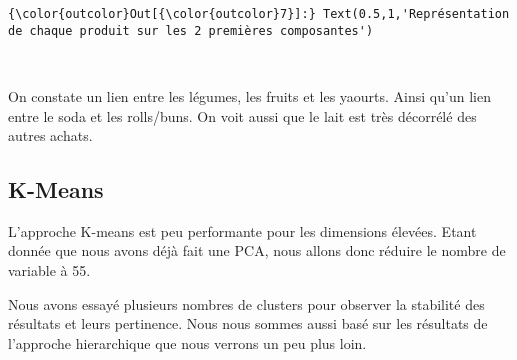 \documentclass[11pt]{article}
\begin{document}
\begin{Verbatim}[commandchars=\\\{\}]
{\color{outcolor}Out[{\color{outcolor}7}]:} Text(0.5,1,'Représentation de chaque produit sur les 2 premières composantes')
\end{Verbatim}
            
    \begin{center}
    \end{center}
    { \hspace*{\fill} \\}
    
    On constate un lien entre les légumes, les fruits et les yaourts. Ainsi
qu'un lien entre le soda et les rolls/buns. On voit aussi que le lait
est très décorrélé des autres achats.

    \subsection{K-Means}\label{k-means}

    L'approche K-means est peu performante pour les dimensions élevées.
Etant donnée que nous avons déjà fait une PCA, nous allons donc réduire
le nombre de variable à 55.

Nous avons essayé plusieurs nombres de clusters pour observer la
stabilité des résultats et leurs pertinence. Nous nous sommes aussi basé
sur les résultats de l'approche hierarchique que nous verrons un peu
plus loin.
\end{document}
